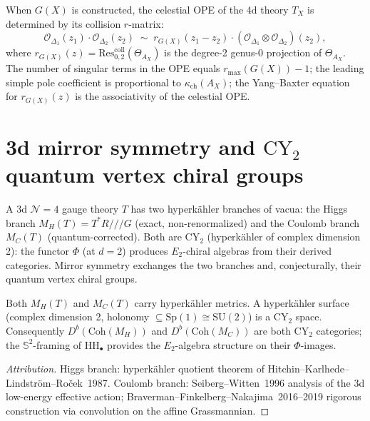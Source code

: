 \begin{conjecture}
\label{conj:phys-cel-ope-r-matrix}
\ClaimStatusConjectured
When $G(X)$ is constructed, the celestial OPE of the 4d theory $T_X$ is determined by its collision $r$-matrix:
\[
\mathcal{O}_{\Delta_1}(z_1) \cdot \mathcal{O}_{\Delta_2}(z_2)
\;\sim\;
r_{G(X)}(z_1 - z_2) \cdot (\mathcal{O}_{\Delta_1} \otimes \mathcal{O}_{\Delta_2})(z_2),
\]
where $r_{G(X)}(z) = \mathrm{Res}^{\mathrm{coll}}_{0,2}(\Theta_{A_X})$ is the degree-2 genus-0 projection of $\Theta_{A_X}$. The number of singular terms in the OPE equals $r_{\max}(G(X)) - 1$; the leading simple pole coefficient is proportional to $\kappa_{\mathrm{ch}}(A_X)$; the Yang--Baxter equation for $r_{G(X)}(z)$ is the associativity of the celestial OPE.
\end{conjecture}

\section{3d mirror symmetry and \texorpdfstring{$\mathrm{CY}_2$}{CY-2} quantum vertex chiral groups}
\label{sec:phys-3dm-cy2}

A 3d $\mathcal{N}=4$ gauge theory $T$ has two hyperk\"{a}hler branches of vacua: the Higgs branch $M_H(T) = T^*R \mathbin{/\!\!/\!\!/} G$ (exact, non-renormalized) and the Coulomb branch $M_C(T)$ (quantum-corrected). Both are $\mathrm{CY}_2$ (hyperk\"{a}hler of complex dimension 2): the functor $\Phi$ (at $d=2$) produces $E_2$-chiral algebras from their derived categories. Mirror symmetry exchanges the two branches and, conjecturally, their quantum vertex chiral groups.

\begin{theorem}
\label{thm:phys-3dm-hk}
Both $M_H(T)$ and $M_C(T)$ carry hyperk\"{a}hler metrics. A hyperk\"{a}hler surface (complex dimension 2, holonomy $\subseteq \mathrm{Sp}(1) \cong \mathrm{SU}(2)$) is a $\mathrm{CY}_2$ space. Consequently $D^b(\mathrm{Coh}(M_H))$ and $D^b(\mathrm{Coh}(M_C))$ are both $\mathrm{CY}_2$ categories; the $\mathbb{S}^2$-framing of $\mathrm{HH}_\bullet$ provides the $E_2$-algebra structure on their $\Phi$-images.
\end{theorem}

\begin{proof}[Attribution]
Higgs branch: hyperk\"{a}hler quotient theorem of Hitchin--Karlhede--Lindstr\"{o}m--Ro\v{c}ek~1987. Coulomb branch: Seiberg--Witten~1996 analysis of the 3d low-energy effective action; Braverman--Finkelberg--Nakajima~2016--2019 rigorous construction via convolution on the affine Grassmannian.
\end{proof}

